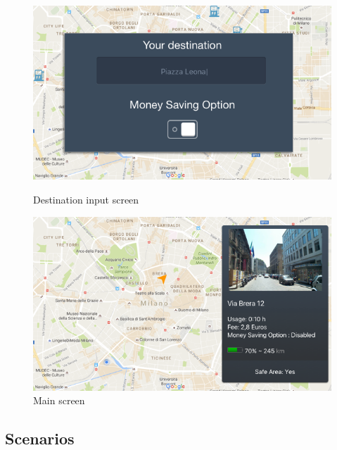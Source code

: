 \documentclass[12pt]{article}
\begin{document}
 	 	\begin{figure}
		 \centering	
		\includegraphics[scale=0.6]{Images/onBoard/Destination.png}
		 \caption{Destination input screen}
		\centering
 	 	\includegraphics[scale=0.6]{Images/onBoard/Main.png}
		  \caption{Main screen}
 	 	\end{figure}
 	 	\clearpage
 	 	
 	 	
 	 	\newpage
 	 	\subsection{Scenarios}
 	 	
\end{document}
